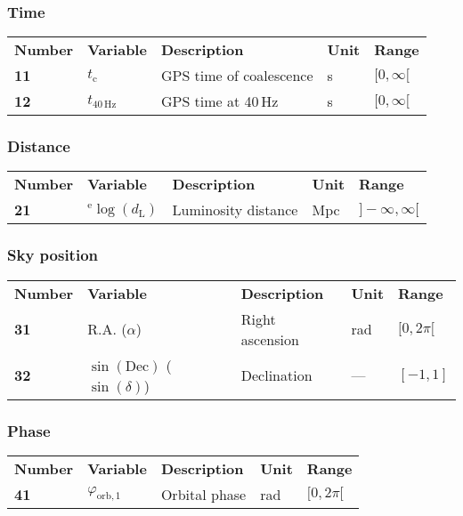 \documentclass[12pt]{article}
\begin{document}
\subsubsection{Time}
\begin{tabular}{lllll}
  \textbf{Number} & \textbf{Variable} & \textbf{Description} & \textbf{Unit} & \textbf{Range} \\
  \textbf{11} & $t_\mathrm{c}$        & GPS time of coalescence & s & $[0,\infty[$ \\
  \textbf{12} & $t_\mathrm{40\,Hz}$   & GPS time at 40\,Hz & s & $[0,\infty[$ \\
\end{tabular}

\subsubsection{Distance}
\begin{tabular}{lllll}
  \textbf{Number} & \textbf{Variable} & \textbf{Description} & \textbf{Unit} & \textbf{Range} \\
  \textbf{21} & $^\mathrm{e}\log(d_\mathrm{L})$ & Luminosity distance & Mpc & $]-\infty,\infty[$ \\
\end{tabular}

\subsubsection{Sky position}
\begin{tabular}{lllll}
  \textbf{Number} & \textbf{Variable} & \textbf{Description} & \textbf{Unit} & \textbf{Range} \\
  \textbf{31} & R.A. ($\alpha$)  & Right ascension & rad & $[0,2\pi[$ \\
  \textbf{32} & $\sin(\mathrm{Dec})$ ($\sin(\delta)$)  & Declination & --- & $[-1,1]$ \\
\end{tabular}


\subsubsection{Phase}
\begin{tabular}{lllll}
  \textbf{Number} & \textbf{Variable} & \textbf{Description} & \textbf{Unit} & \textbf{Range} \\
  \textbf{41} & $\varphi_\mathrm{orb,1}$  & Orbital phase & rad & $[0,2\pi[$ \\
\end{tabular}
\end{document}
